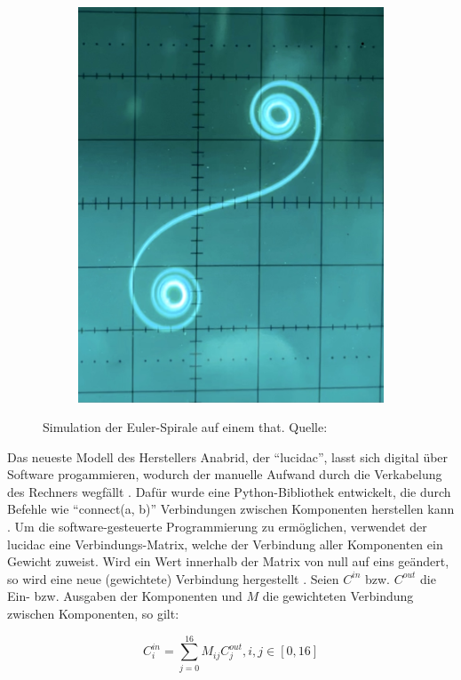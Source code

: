 \begin{figure}[h]
\begin{subfigure}{.2\textwidth}
    \includegraphics[width=\textwidth]{abbildungen/euler_spirale_ausgabe.jpg}\par
  \end{subfigure}
  \caption{Simulation der Euler-Spirale auf einem \ac{that}. Quelle: \cite{TheAnalogThingDocs}}
  \label{fig:THAT Euler Spirale}
\end{figure}

Das neueste Modell des Herstellers Anabrid, der "`lucidac"', lasst sich digital über Software progammieren, wodurch der manuelle Aufwand durch die Verkabelung des Rechners wegfällt \cite[vgl.]{AnabridLucidAC2025}. Dafür wurde eine Python-Bibliothek entwickelt, die durch Befehle wie "`connect(a, b)"' Verbindungen zwischen Komponenten herstellen kann \cite[vgl.]{AnabridLucipy}. Um die software-gesteuerte Programmierung zu ermöglichen, verwendet der lucidac eine Verbindungs-Matrix, welche der Verbindung aller Komponenten ein Gewicht zuweist. Wird ein Wert innerhalb der Matrix von null auf \zb eins geändert, so wird eine neue (gewichtete) Verbindung hergestellt \cite{AnabridLucidAC2025}. Seien \(C^{in}\) bzw. \(C^{out}\) die Ein- bzw. Ausgaben der Komponenten und \(M\) die gewichteten Verbindung zwischen Komponenten, so gilt:

\[C_i^{in}=\sum_{j=0}^{16}M_{ij}C_j^{out}, i,j\in[0,16]\]
